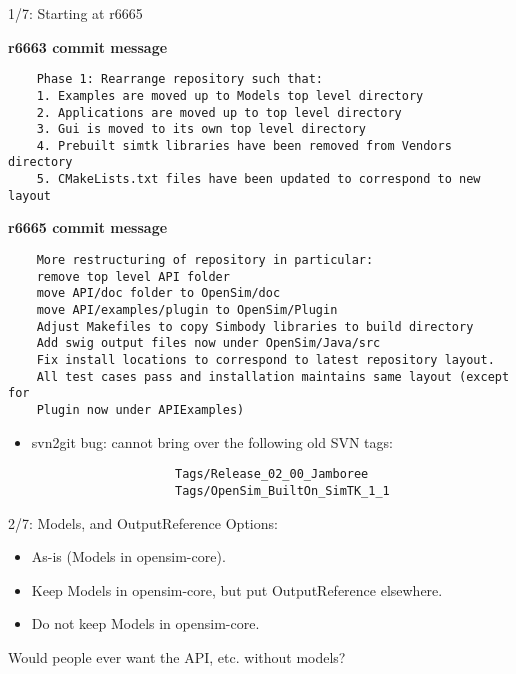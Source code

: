 \documentclass[pdf, 8pt]{beamer}
\def\NUMDECISIONS{7}
\begin{document}
\begin{frame}[fragile]{1/\NUMDECISIONS: Starting at r6665}

    \textbf{r6663 commit message}

    \begin{Verbatim}
    Phase 1: Rearrange repository such that:
    1. Examples are moved up to Models top level directory
    2. Applications are moved up to top level directory
    3. Gui is moved to its own top level directory
    4. Prebuilt simtk libraries have been removed from Vendors directory
    5. CMakeLists.txt files have been updated to correspond to new layout
\end{Verbatim}

    \textbf{r6665 commit message}

\begin{Verbatim}
    More restructuring of repository in particular:
    remove top level API folder
    move API/doc folder to OpenSim/doc 
    move API/examples/plugin to OpenSim/Plugin
    Adjust Makefiles to copy Simbody libraries to build directory
    Add swig output files now under OpenSim/Java/src
    Fix install locations to correspond to latest repository layout.
    All test cases pass and installation maintains same layout (except for
    Plugin now under APIExamples)
\end{Verbatim}


    \begin{itemize}
            \item svn2git bug: cannot bring over the following old SVN tags:
                \begin{Verbatim}
                    Tags/Release_02_00_Jamboree
                    Tags/OpenSim_BuiltOn_SimTK_1_1
                \end{Verbatim}
        \end{itemize}
\end{frame}

\begin{frame}{2/\NUMDECISIONS: Models, and OutputReference}
    Options:
    \begin{itemize}
            \item As-is (Models in opensim-core).
            \item Keep Models in opensim-core, but put OutputReference
                elsewhere.
            \item Do not keep Models in opensim-core.
    \end{itemize}
    Would people ever want the API, etc. without models?
\end{frame}
\end{document}

